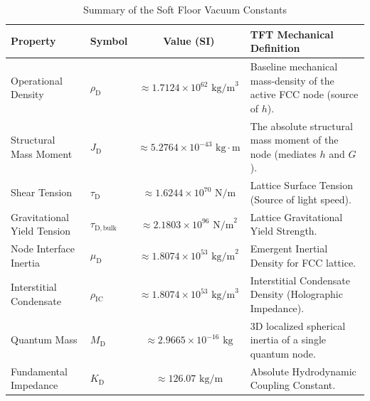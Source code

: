 \begin{table}[htbp]
\centering
\caption{Summary of the Soft Floor Vacuum Constants}
\vspace{0.2cm}
\label{tab:soft_floor_constants}
\renewcommand{\arraystretch}{1.5}
\setlength{\tabcolsep}{4pt}
\small
\begin{tabular}{@{}llcp{}@{}}
\toprule
\textbf{Property} & \textbf{Symbol} & \textbf{Value (SI)} & \textbf{TFT Mechanical Definition} \\
\midrule
Operational Density & $\rho_{\mathrm{D}}$ & $\approx 1.7124 \times 10^{62} \text{ kg/m}^3$ & Baseline mechanical mass-density of the active FCC node (source of $h$). \\
Structural Mass Moment & $J_{\mathrm{D}}$ & $\approx 5.2764 \times 10^{-43} \text{ kg}\cdot\text{m}$ & The absolute structural mass moment of the node (mediates $h$ and $G$). \\
Shear Tension & $\tau_{\mathrm{D}}$ & $\approx 1.6244 \times 10^{70} \text{ N/m}$ & Lattice Surface Tension (Source of light speed). \\
Gravitational Yield Tension & $\tau_{\mathrm{D,bulk}}$ & $\approx 2.1803 \times 10^{96} \text{ N/m}^2$ & Lattice Gravitational Yield Strength. \\
Node Interface Inertia & $\mu_{\mathrm{D}}$ & $\approx 1.8074 \times 10^{53} \text{ kg/m}^2$ & Emergent Inertial Density for FCC lattice. \\
Interstitial Condensate & $\rho_{\mathrm{IC}}$ & $\approx 1.8074 \times 10^{53} \text{ kg/m}^3$ & Interstitial Condensate Density (Holographic Impedance). \\
Quantum Mass & $M_{\mathrm{D}}$ & $\approx 2.9665 \times 10^{-16} \text{ kg}$ & 3D localized spherical inertia of a single quantum node. \\
Fundamental Impedance & $K_{\mathrm{D}}$ & $\approx 126.07 \text{ kg/m}$ & Absolute Hydrodynamic Coupling Constant. \\
\bottomrule
\end{tabular}
\end{table}